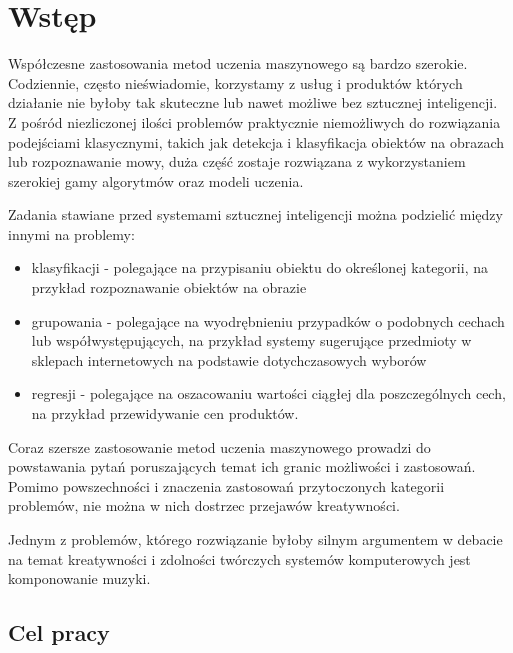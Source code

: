 
\chapter{Wstęp}
{
    Współczesne zastosowania metod uczenia maszynowego są bardzo szerokie. Codziennie, często nieświadomie,
    korzystamy z\,\,usług i\,\,produktów których działanie nie byłoby tak skuteczne lub nawet możliwe bez sztucznej inteligencji.
    Z\,\,pośród niezliczonej ilości problemów praktycznie niemożliwych do rozwiązania podejściami klasycznymi, 
    takich jak detekcja i\,\,klasyfikacja obiektów na obrazach lub rozpoznawanie mowy,
    duża część zostaje rozwiązana z\,\,wykorzystaniem szerokiej gamy algorytmów oraz modeli uczenia.

    Zadania stawiane przed systemami sztucznej inteligencji można podzielić między innymi na problemy:
    \begin{itemize}
        \setlength\itemsep{-0.5em}
        \item klasyfikacji - polegające na przypisaniu obiektu do określonej kategorii, 
        na przykład rozpoznawanie obiektów na obrazie 
        \item grupowania - polegające na wyodrębnieniu przypadków o\,\,podobnych cechach 
        lub współwystępujących, na przykład systemy sugerujące przedmioty w\,\,sklepach internetowych na podstawie dotychczasowych wyborów
        \item regresji - polegające na oszacowaniu wartości ciągłej dla poszczególnych cech, 
        na przykład przewidywanie cen produktów.
    \end{itemize}

    \pagebreak

    Coraz szersze zastosowanie metod uczenia maszynowego prowadzi do powstawania pytań poruszających temat 
    ich granic możliwości i\,\,zastosowań.
    Pomimo powszechności i\,\,znaczenia zastosowań przytoczonych kategorii problemów, nie można w\,\,nich dostrzec przejawów kreatywności.
    
    Jednym z\,\,problemów, którego rozwiązanie byłoby silnym argumentem w\,\,debacie na temat kreatywności i\,\,zdolności twórczych
    systemów komputerowych jest komponowanie muzyki.

    \section{Cel pracy}
    {

}}
